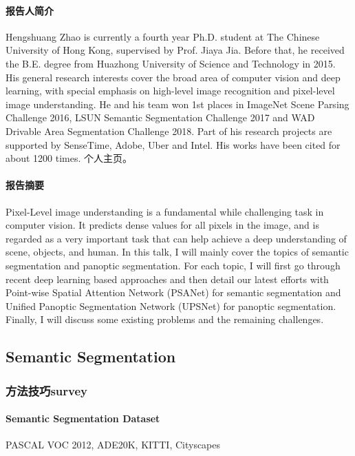 \documentclass[UTF8, a4paper]{ctexart}
\begin{document}
\paragraph{报告人简介}
Hengshuang Zhao is currently a fourth year Ph.D. student at The Chinese University of Hong Kong, supervised by Prof. Jiaya Jia. 
Before that, he received the B.E. degree from Huazhong University of Science and Technology in 2015. 
His general research interests cover the broad area of computer vision and deep learning, with special emphasis on high-level image recognition and pixel-level image understanding. 
He and his team won 1st places in ImageNet Scene Parsing Challenge 2016, LSUN Semantic Segmentation Challenge 2017 and WAD Drivable Area Segmentation Challenge 2018. 
Part of his research projects are supported by SenseTime, Adobe, Uber and Intel. His works have been cited for about 1200 times.
个人主页\cite{Hengshuang}。

\paragraph{报告摘要}
Pixel-Level image understanding is a fundamental while challenging task in computer vision. It predicts dense values for all pixels in the image, and is regarded as a very important task that can help achieve a deep understanding of scene, objects, and human. In this talk, I will mainly cover the topics of semantic segmentation and panoptic segmentation. For each topic, I will first go through recent deep learning based approaches and then detail our latest efforts with Point-wise Spatial Attention Network (PSANet) for semantic segmentation and Unified Panoptic Segmentation Network (UPSNet) for panoptic segmentation. Finally, I will discuss some existing problems and the remaining challenges.

\subsection{Semantic Segmentation}

\subsubsection{方法技巧survey}

\paragraph{Semantic Segmentation Dataset}
PASCAL VOC 2012, ADE20K, KITTI, Cityscapes
\end{document}
